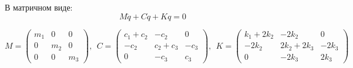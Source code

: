 \documentclass[a4paper, 12pt]{article}
\begin{document}
В матричном виде:
\[
M \ddot q + C \dot q + K q = 0
\]

\[
M = \begin{pmatrix}
m_1 & 0 & 0 \\
0 & m_2 & 0\\
0 & 0 & m_3
\end{pmatrix},\ \ 
C = \begin{pmatrix}
c_1 + c_2 & -c_2 & 0  \\
-c_2 & c_2 + c_3 & -c_3\\
0 & -c_3 & c_3
\end{pmatrix},\ \ 
K = \begin{pmatrix}
k_1 + 2k_2 & -2k_2 & 0 \\
-2k_2 & 2k_2 + 2k_3 & -2k_3\\
0 & -2k_3 & 2k_3
\end{pmatrix}
\]
\end{document}
